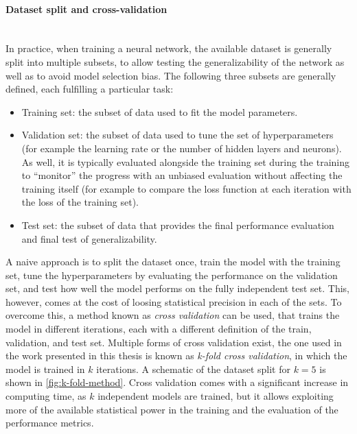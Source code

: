 \paragraph{Dataset split and cross-validation}\mbox{}\\
In practice, when training a neural network, the available dataset is generally split into multiple subsets, to allow testing the generalizability of the network as well as to avoid model selection bias.
The following three subsets are generally defined, each fulfilling a particular task:
\begin{itemize}
    \item Training set: the subset of data used to fit the model parameters.
    \item Validation set: the subset of data used to tune the set of hyperparameters (for example the learning rate or the number of hidden layers and neurons). As well, it is typically evaluated alongside the training set during the training to ``monitor'' the progress with an unbiased evaluation without affecting the training itself (for example to compare the loss function at each iteration with the loss of the training set). 
    \item Test set: the subset of data that provides the final performance evaluation and final test of generalizability. 
\end{itemize}

A naive approach is to split the dataset once, train the model with the training set, tune the hyperparameters by evaluating the performance on the validation set, and test how well the model performs on the fully independent test set. 
This, however, comes at the cost of loosing statistical precision in each of the sets. 
To overcome this, a method known as \emph{cross validation} can be used, that trains the model in different iterations, each with a different definition of the train, validation, and test set.
Multiple forms of cross validation exist, the one used in the work presented in this thesis is known as \emph{k-fold cross validation}, in which the model is trained in $k$ iterations. A schematic of the dataset split for $k=5$ is shown in \cref{fig:k-fold-method}. 
Cross validation comes with a significant increase in computing time, as $k$ independent models are trained, but it allows exploiting more of the available statistical power in the training and the evaluation of the performance metrics.

